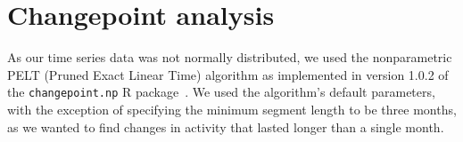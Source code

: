 \documentclass[10pt,conference]{IEEEtran}
\begin{document}

\section{Changepoint analysis}

As our time series data was not normally distributed, we used the nonparametric PELT (Pruned Exact Linear Time) algorithm as implemented in version 1.0.2 of the \texttt{changepoint.np} R package~\cite{killick2014changepoint}. We used the algorithm's default parameters, with the exception of specifying the minimum segment length to be three months, as we wanted to find changes in activity that lasted longer than a single month.

\end{document}
